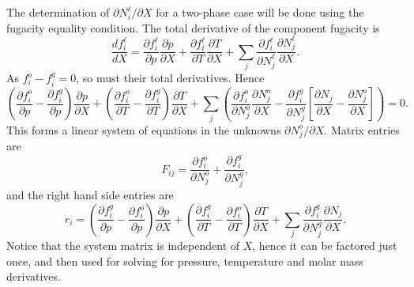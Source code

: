 The determination of $\partial N_i^\ell/\partial X$ for a two-phase
case will be done using the fugacity equality condition. The total
derivative of the component fugacity is
\begin{equation}
  \frac{d f_i^\ell}{d X} =
  \frac{\partial f_i^\ell}{\partial p}
  \frac{\partial p}{\partial X} +
  \frac{\partial f_i^\ell}{\partial T}
  \frac{\partial T}{\partial X} +
  \sum_j
  \frac{\partial f_i^\ell}{\partial N_j^\ell}
  \frac{\partial N_j^\ell}{\partial X}.
\end{equation}
As $f_i^o - f_i^g = 0$, so must their total derivatives. Hence
\begin{equation}
  \left(
    \frac{\partial f_i^o}{\partial p} -
    \frac{\partial f_i^g}{\partial p}
  \right)
  \frac{\partial p}{\partial X} +
  \left(
    \frac{\partial f_i^o}{\partial T} -
    \frac{\partial f_i^g}{\partial T}
  \right)
  \frac{\partial T}{\partial X} +
  \sum_j
  \left(
    \frac{\partial f_i^o}{\partial N_j^o}
    \frac{\partial N_j^o}{\partial X} -
    \frac{\partial f_i^g}{\partial N_j^g}
    \left[
      \frac{\partial N_j}{\partial X} -
      \frac{\partial N_j^o}{\partial X}
    \right]
  \right) = 0.
\end{equation}
This forms a linear system of equations in the unknowns $\partial
N_j^o/\partial X$. Matrix entries are
\begin{equation}
  F_{ij} = 
  \frac{\partial f_i^o}{\partial N_j^o} +
  \frac{\partial f_i^g}{\partial N_j^g},
\end{equation}
and the right hand side entries are
\begin{equation}
  r_i =
  \left(
    \frac{\partial f_i^g}{\partial p} -
    \frac{\partial f_i^o}{\partial p}
  \right)
  \frac{\partial p}{\partial X} +
  \left(
    \frac{\partial f_i^g}{\partial T} -
    \frac{\partial f_i^o}{\partial T}
  \right)
  \frac{\partial T}{\partial X} +
  \sum_j
  \frac{\partial f_i^g}{\partial N_j^g}
  \frac{\partial N_j}{\partial X}.
\end{equation}
Notice that the system matrix is independent of $X$, hence it can be
factored just once, and then used for solving for pressure,
temperature and molar mass derivatives.



